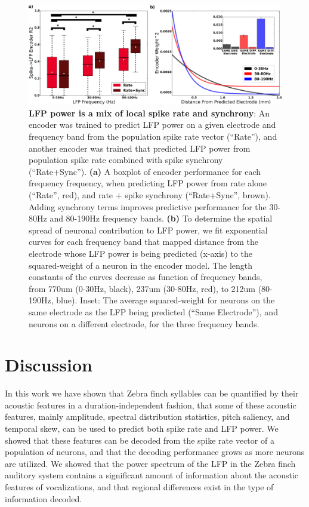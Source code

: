 \begin{figure}
    \caption{\textbf{LFP power is a mix of local spike rate and synchrony}: An encoder was trained to predict LFP power on a given electrode and frequency band from the population spike rate vector (``Rate''), and another encoder was trained that predicted LFP power from population spike rate combined with spike synchrony (``Rate+Sync''). \textbf{(a)} A boxplot of encoder performance for each frequency frequency, when predicting LFP power from rate alone (``Rate'', red), and rate + spike synchrony (``Rate+Sync'', brown). Adding synchrony terms improves predictive performance for the 30-80Hz and 80-190Hz frequency bands. \textbf{(b)} To determine the spatial spread of neuronal contribution to LFP power, we fit exponential curves for each frequency band that mapped distance from the electrode whose LFP power is being predicted (x-axis) to the squared-weight of a neuron in the encoder model. The length constants of the curves decrease as function of frequency bands, from 770um (0-30Hz, black), 237um (30-80Hz, red), to 212um (80-190Hz, blue).  Inset: The average squared-weight for neurons on the same electrode as the LFP being predicted (“Same Electrode”), and neurons on a different electrode, for the three frequency bands.
}
    \centering
    \includegraphics[scale=0.25]{figure8.eps}
\end{figure}


\section{Discussion}

In this work we have shown that Zebra finch syllables can be quantified by their acoustic features in a duration-independent fashion, that some of these acoustic features, mainly amplitude, spectral distribution statistics, pitch saliency, and temporal skew, can be used to predict both spike rate and LFP power. We showed that these features can be decoded from the spike rate vector of a population of neurons, and that the decoding performance grows as more neurons are utilized. We showed that the power spectrum of the LFP in the Zebra finch auditory system contains a significant amount of information about the acoustic features of vocalizations, and that regional differences exist in the type of information decoded.


